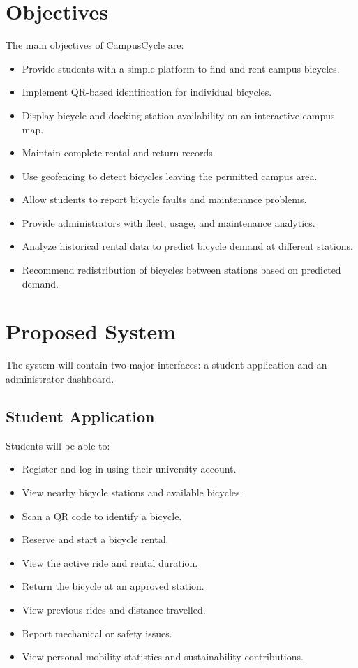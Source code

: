 \documentclass[12pt,a4paper]{article}
\begin{document}
\section{Objectives}

The main objectives of CampusCycle are:

\begin{itemize}[leftmargin=*]
    \item Provide students with a simple platform to find and rent campus bicycles.
    \item Implement QR-based identification for individual bicycles.
    \item Display bicycle and docking-station availability on an interactive campus map.
    \item Maintain complete rental and return records.
    \item Use geofencing to detect bicycles leaving the permitted campus area.
    \item Allow students to report bicycle faults and maintenance problems.
    \item Provide administrators with fleet, usage, and maintenance analytics.
    \item Analyze historical rental data to predict bicycle demand at different stations.
    \item Recommend redistribution of bicycles between stations based on predicted demand.
\end{itemize}

\section{Proposed System}

The system will contain two major interfaces: a student application and an administrator dashboard.

\subsection{Student Application}

Students will be able to:

\begin{itemize}[leftmargin=*]
    \item Register and log in using their university account.
    \item View nearby bicycle stations and available bicycles.
    \item Scan a QR code to identify a bicycle.
    \item Reserve and start a bicycle rental.
    \item View the active ride and rental duration.
    \item Return the bicycle at an approved station.
    \item View previous rides and distance travelled.
    \item Report mechanical or safety issues.
    \item View personal mobility statistics and sustainability contributions.
\end{itemize}
\end{document}
